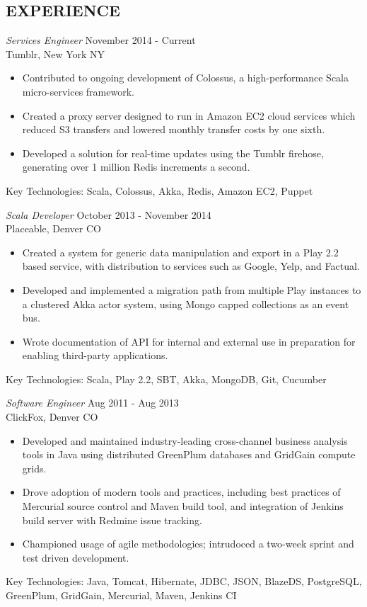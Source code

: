 \documentclass[line,margin]{res}
\begin{document}
\address{720-301-4407 / zoe@zgagnon.com}
\address{Twitter: @ZoeCraftsCode}

\begin{resume}
 
\section{EXPERIENCE}
{\sl Services Engineer} \hfill November 2014 - Current\\
Tumblr, New York NY
\begin{itemize}
\item Contributed to ongoing development of Colossus, a high-performance Scala micro-services 
framework.
\item Created a proxy server designed to run in Amazon EC2 cloud services which reduced S3 transfers and lowered monthly transfer costs by one sixth.
\item Developed a solution for real-time updates using the Tumblr firehose, generating over 1 million Redis increments a second.
\end{itemize}
Key Technologies: Scala, Colossus, Akka, Redis, Amazon EC2, Puppet

{\sl Scala Developer} \hfill October 2013 - November 2014\\
Placeable, Denver CO
\begin{itemize} 
\item Created a system for generic data manipulation and export in a Play 2.2 based service, with distribution to services such as Google, Yelp, and Factual.
\item Developed and implemented a migration path from multiple Play instances to a clustered Akka actor system, using Mongo capped collections as an event bus.
\item Wrote documentation of API for internal and external use in preparation for enabling third-party applications.
\end{itemize}
Key Technologies: Scala, Play 2.2, SBT, Akka, MongoDB, Git, Cucumber

 {\sl Software Engineer} \hfill               Aug 2011 - Aug 2013 \\
     ClickFox, Denver CO
                 \begin{itemize} %
                 \item Developed and maintained industry-leading cross-channel business analysis tools in Java using distributed GreenPlum databases and GridGain compute grids.
                \item Drove adoption of modern tools and practices, including best practices of Mercurial source control and Maven build tool, and integration of Jenkins build server with Redmine issue tracking.
   	    \item  Championed usage of agile methodologies; intrudoced a two-week sprint and test driven development.
\end{itemize}
	Key Technologies: Java, Tomcat, Hibernate, JDBC, JSON, BlazeDS, PostgreSQL, GreenPlum, GridGain, Mercurial, Maven, Jenkins CI
 \pagebreak
 

\end{resume}
\end{document}
